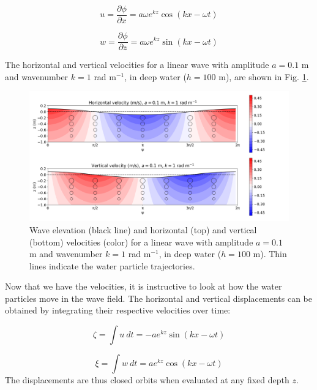 \documentclass[12pt]{article}
\numberwithin{equation}{section}
\numberwithin{figure}{section}
\numberwithin{table}{section}
\begin{document}
\begin{equation}
  u = \frac{\partial \phi}{\partial x} = a \omega e^{kz} \cos(kx - \omega t)
  \label{eq:wave_horizontal_velocity}
\end{equation}

\begin{equation}
  w = \frac{\partial \phi}{\partial z} = a \omega e^{kz} \sin(kx - \omega t)
  \label{eq:wave_vertical_velocity}
\end{equation}

The horizontal and vertical velocities for a linear wave with amplitude $a = 0.1$ m
and wavenumber $k = 1$ rad m$^{-1}$, in deep water ($h = 100$ m), are shown in
Fig. \ref{fig:wave_velocities}.

\begin{figure}[h]
  \centering
  \includegraphics[width=\textwidth]{assets/fig_wave_velocities.png}
  \caption{
    Wave elevation (black line) and horizontal (top) and vertical (bottom)
    velocities (color) for a linear wave with amplitude $a = 0.1$ m and
    wavenumber $k = 1$ rad m$^{-1}$, in deep water ($h = 100$ m).
    Thin lines indicate the water particle trajectories.
  }
  \label{fig:wave_velocities}
\end{figure}

Now that we have the velocities, it is instructive to look at how the water
particles move in the wave field.
The horizontal and vertical displacements can be obtained by integrating their
respective velocities over time:

\begin{equation}
  \zeta = \int u\ dt = - a e^{kz} \sin(kx - \omega t)
  \label{eq:wave_horizontal_displacement}
\end{equation}

\begin{equation}
  \xi = \int w\ dt = a e^{kz} \cos(kx - \omega t)
  \label{eq:wave_vertical_displacement}
\end{equation}
The displacements are thus closed orbits when evaluated at any fixed depth $z$.
\end{document}
